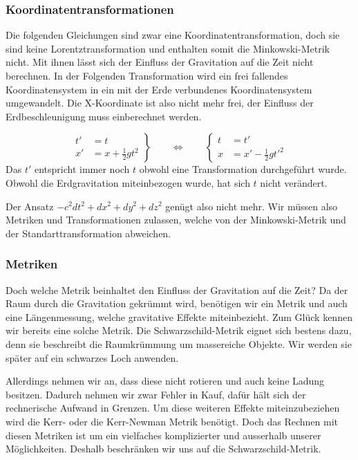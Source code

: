 \begin{refsection}
	\subsubsection{Koordinatentransformationen}
	
	Die folgenden Gleichungen sind zwar eine Koordinatentransformation, doch sie sind keine Lorentztransformation und enthalten somit die Minkowski-Metrik nicht. Mit ihnen lässt sich der Einfluss der Gravitation auf die Zeit nicht berechnen. 
	In der Folgenden Transformation wird ein frei fallendes Koordinatensystem in ein mit der Erde verbundenes Koordinatensystem umgewandelt. Die X-Koordinate ist also nicht mehr frei,  der Einfluss der Erdbeschleunigung muss einberechnet werden.
	
	\begin{equation}
	\left.
	\begin{aligned}
	t'&=t\\
	x'&=x+\frac12gt^2
	\end{aligned}
	\right\}
	\qquad
	\Leftrightarrow
	\qquad
	\left\{
	\begin{aligned}
	t&=t'\\
	x&=x'-\frac12gt'^2
	\end{aligned}
	\right.
	\end{equation}
	Das $t'$ entspricht immer noch $t$ obwohl eine Transformation durchgeführt wurde. Obwohl die Erdgravitation miteinbezogen wurde, hat sich $t$ nicht verändert.
	
	Der Ansatz $ -c^2dt^2 + dx^2 + dy^2 + dz^2$ genügt also nicht mehr. Wir müssen also Metriken und Transformationen zulassen, welche von der Minkowski-Metrik und der Standarttransformation abweichen.
	
	\subsubsection{Metriken}\label{skript:chapter:zeitreisen:metriken}
	
	Doch welche Metrik beinhaltet den Einfluss der Gravitation auf die Zeit? 
	Da der Raum durch die Gravitation gekrümmt wird, benötigen wir ein Metrik und auch eine Längenmessung, welche gravitative Effekte miteinbezieht.
	Zum Glück kennen wir bereits eine solche Metrik. Die Schwarzschild-Metrik eignet sich bestens dazu, denn sie beschreibt die Raumkrümmung um massereiche Objekte. Wir werden sie später auf ein schwarzes Loch anwenden. 
	
	Allerdings nehmen wir an, dass diese nicht rotieren und auch keine Ladung besitzen. Dadurch nehmen wir zwar Fehler in Kauf, dafür hält sich der rechnerische Aufwand in Grenzen. Um diese weiteren Effekte miteinzubeziehen wird die Kerr- oder die Kerr-Newman Metrik benötigt. Doch das Rechnen mit diesen Metriken ist um ein vielfaches komplizierter und ausserhalb unserer Möglichkeiten. Deshalb beschränken wir uns auf die Schwarzschild-Metrik.


\end{refsection}
